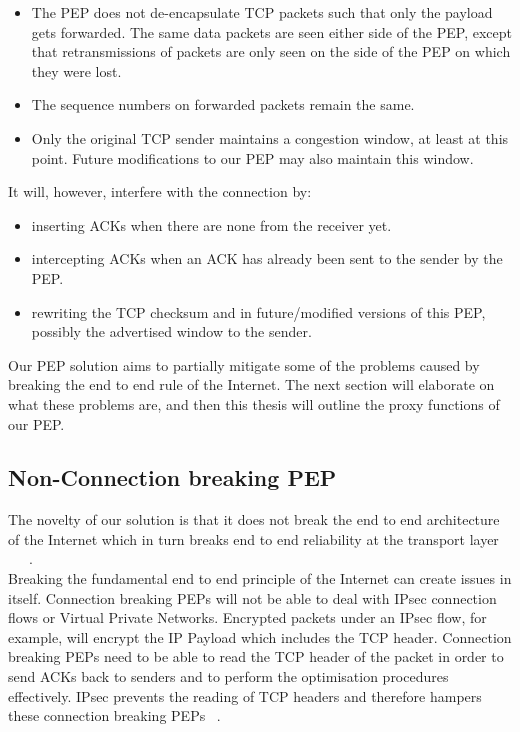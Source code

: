 \begin{itemize}
\item The PEP does not de-encapsulate TCP packets such that only the payload gets forwarded. The same data packets are seen either side of the PEP, except that retransmissions of packets are only seen on the side of the PEP on which they were lost.
\item The sequence numbers on forwarded packets remain the same. 
\item Only the original TCP sender maintains a congestion window, at least at this point. Future modifications to our PEP may also maintain this window.\\
\end{itemize}

It will, however, interfere with the connection by: \\

\begin{itemize}
\item inserting ACKs when there are none from the receiver yet.
\item intercepting ACKs when an ACK has already been sent to the sender by the PEP.
\item rewriting the TCP checksum and in future/modified versions of this PEP, possibly the advertised window to the sender.\\
\end{itemize}

Our PEP solution aims to partially mitigate some of the problems caused by breaking the end to end rule of the Internet. The next section will elaborate on what these problems are, and then this thesis will outline the proxy functions of our PEP. 

\subsection{Non-Connection breaking PEP}
The novelty of our solution is that it does not break the end to end architecture of the Internet which in turn breaks end to end reliability at the transport layer ~\cite{6}~\cite{13}~\cite{14}. \\

Breaking the fundamental end to end principle of the Internet can create issues in itself. Connection breaking PEPs will not be able to deal with IPsec connection flows or Virtual Private Networks. Encrypted packets under an IPsec flow, for example, will encrypt the IP Payload which includes the TCP header. Connection breaking PEPs need to be able to read the TCP header of the packet in order to send ACKs back to senders and to perform the optimisation procedures effectively. IPsec prevents the reading of TCP headers and therefore hampers these connection breaking PEPs ~\cite{14}.\\ 

